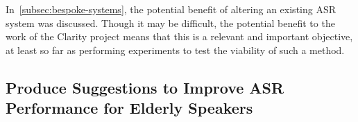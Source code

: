 In~\ref{subsec:bespoke-systems}, the potential benefit of altering an existing ASR system was
discussed.
Though it may be difficult, the potential benefit to the work of the Clarity project means that
this is a relevant and important objective, at least so far as performing experiments to test the
viability of such a method.

\subsection{Produce Suggestions to Improve ASR Performance for Elderly Speakers}\label{subsec:aim5}

